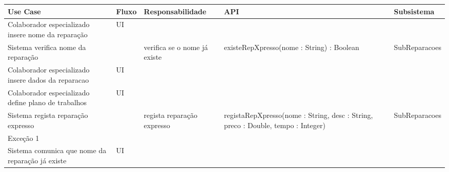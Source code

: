 \documentclass[../relatorio.tex]{subfiles}
\begin{document}
\begin{landscape}
    \begin{table}[!h]
        \centering
        \begin{tabular}{|p{5cm}|p{1cm}|p{4cm}|p{6cm}|p{3cm}|}
            \hline
            \rowcolor{gray!20!white}
            Use Case & Fluxo                                            & Responsabilidade & API & Subsistema \\
            \hline
            \rowcolor{yellow}
            Colaborador especializado insere nome da reparação
                     & UI
                     & 
                     & 
                     & 
            \\
            \hline
            Sistema verifica nome da reparação
                     & 
                     & verifica se o nome já existe
                     & existeRepXpresso(nome : String) : Boolean
                     & SubReparacoes
            \\
            \hline
            \rowcolor{yellow}
            Colaborador especializado insere dados da reparacao
                     & UI
                     & 
                     & 
                     & 
            \\
            \hline
            Colaborador especializado define plano de trabalhos
                     & UI
                     & 
                     & 
                     & 
            \\
            \hline
            Sistema regista reparação expresso
                     & 
                     & regista reparação expresso
                     & registaRepXpresso(nome : String, desc : String, preco : Double, tempo : Integer)
                     & SubReparacoes
            \\
            \hline
            \rowcolor{red!30}
            Exceção 1 &                                                  &                  &     &            \\
            \hline
            Sistema comunica que nome da reparação já existe
                     & UI
                     & 
                     & 
                     & 
            \\
            \hline
        \end{tabular}
    \end{table}
\end{landscape}
\end{document}
